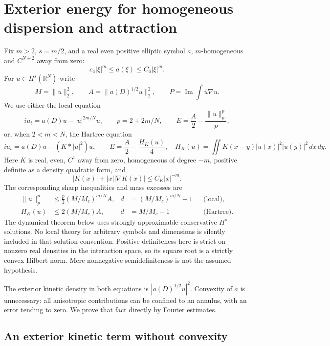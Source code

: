 \section{Exterior energy for homogeneous dispersion and attraction}
\label{sec:r13-dispersion-structure}

Fix $m>2$, $s=m/2$, and a real even positive elliptic symbol $a$,
$m$-homogeneous and $C^{N+2}$ away from zero:
\[
 c_a|\xi|^m\le a(\xi)\le C_a|\xi|^m.
\]
For $u\in H^s(\mathbb R^N)$ write
\[
 M=\|u\|_2^2,\qquad A=\|a(D)^{1/2}u\|_2^2,\qquad
 P=\operatorname{Im}\int\overline u\nabla u.
\]
We use either the local equation
\begin{equation}\label{r13g:equation}
 iu_t=a(D)u-|u|^{2m/N}u,\qquad
 p=2+2m/N,\qquad E=\frac A2-\frac{\|u\|_p^p}{p},
\end{equation}
or, when $2<m<N$, the Hartree equation
\begin{equation}\label{r13g:hartree-equation}
 iu_t=a(D)u-(K*|u|^2)u,\qquad
 E=\frac A2-\frac{H_K(u)}4,
 \quad H_K(u)=\iint K(x-y)|u(x)|^2|u(y)|^2\,dx\,dy.
\end{equation}
Here $K$ is real, even, $C^1$ away from zero, homogeneous of degree
$-m$, positive definite as a density quadratic form, and
\[
 |K(x)|+|x||\nabla K(x)|\le C_K|x|^{-m}.
\]
The corresponding sharp inequalities and mass excesses are
\begin{align*}
 \|u\|_p^p&\le\frac p2(M/M_c)^{m/N}A,
 &d&=(M/M_c)^{m/N}-1 &&\text{(local)},\\
 H_K(u)&\le2(M/M_c)A,
 &d&=M/M_c-1 &&\text{(Hartree)}.
\end{align*}
The dynamical theorem below uses strongly approximable conservative
$H^s$ solutions. No local theory for arbitrary symbols and dimensions
is silently included in that solution convention.
Positive definiteness here is strict on nonzero real densities in the
interaction space, so its square root is a strictly convex Hilbert
norm. Mere nonnegative semidefiniteness is not the assumed hypothesis.

The exterior kinetic density in both equations is
$|a(D)^{1/2}u|^2$. Convexity of $a$ is unnecessary: all anisotropic
contributions can be confined to an annulus, with an error tending to
zero. We prove that fact directly by Fourier estimates.

\subsection{An exterior kinetic term without convexity}

